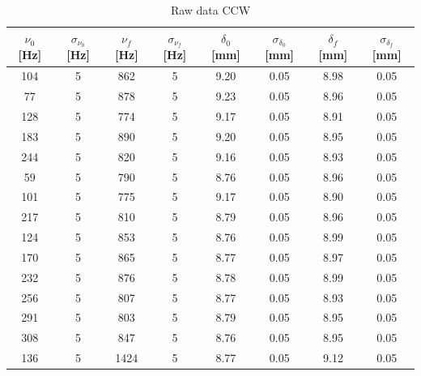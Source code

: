 \documentclass[openright]{article}
\begin{document}
    \begin{table}[H]
        \centering
        \begin{tabular}{ cccccccc } 
            \toprule
            $\nu_0$ [Hz] & $\sigma_{\nu_0}$ [Hz] & $\nu_f$ [Hz] &  $\sigma_{\nu_f}$ [Hz] & $\delta_0$ [mm] & $\sigma_{\delta_0}$ [mm] & $\delta_f$ [mm] & $\sigma_{\delta_f}$ [mm] \\ 
            \midrule
            104 & 5 & 862 &  5 & 9.20 & 0.05 & 8.98 & 0.05  \\ 
            77  & 5 & 878 &  5 & 9.23 & 0.05 & 8.96 & 0.05  \\ 
            128 & 5 & 774 &  5 & 9.17 & 0.05 & 8.91 & 0.05  \\
            183 & 5 & 890 &  5 & 9.20 & 0.05 & 8.95 & 0.05  \\ 
            244 & 5 & 820 &  5 & 9.16 & 0.05 & 8.93 & 0.05  \\ 
            59  & 5 & 790 &  5 & 8.76 & 0.05 & 8.96 & 0.05  \\ 
            101 & 5 & 775 &  5 & 9.17 & 0.05 & 8.90 & 0.05  \\ 
            217 & 5 & 810 &  5 & 8.79 & 0.05 & 8.96 & 0.05  \\ 
            124 & 5 & 853 &  5 & 8.76 & 0.05 & 8.99 & 0.05  \\ 
            170 & 5 & 865 &  5 & 8.77 & 0.05 & 8.97 & 0.05  \\ 
            232 & 5 & 876 &  5 & 8.78 & 0.05 & 8.99 & 0.05  \\ 
            256 & 5 & 807 &  5 & 8.77 & 0.05 & 8.93 & 0.05  \\ 
            291 & 5 & 803 &  5 & 8.79 & 0.05 & 8.95 & 0.05  \\ 
            308 & 5 & 847 &  5 & 8.76 & 0.05 & 8.95 & 0.05  \\ 
            136 & 5 & 1424 & 5 & 8.77 & 0.05 & 9.12 & 0.05  \\ 

            \bottomrule           \end{tabular}
        \caption{Raw data CCW}
    \end{table}
    
\end{document}
